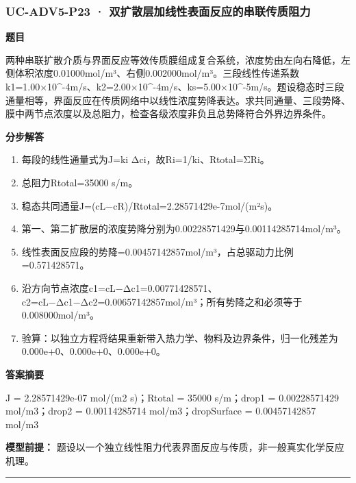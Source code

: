 \documentclass[UTF8,11pt,a4paper]{ctexart}
\begin{document}
\subsubsection*{UC-ADV5-P23 · 双扩散层加线性表面反应的串联传质阻力}
\noindent\textbf{题目}\par
两种串联扩散介质与界面反应等效传质膜组成复合系统，浓度势由左向右降低，左侧体积浓度0.01000mol/m³、右侧0.002000mol/m³。三段线性传递系数k1=1.00×10\textasciicircum{}-4m/s、k2=2.00×10\textasciicircum{}-4m/s、ks=5.00×10\textasciicircum{}-5m/s。题设稳态时三段通量相等，界面反应在传质网络中以线性浓度势降表达。求共同通量、三段势降、膜中两节点浓度以及总阻力，检查各级浓度非负且总势降符合外界边界条件。\par
\medskip\noindent\textbf{分步解答}
\begin{enumerate}
\item 每段的线性通量式为J=ki Δci，故Ri=1/ki、Rtotal=ΣRi。
\item 总阻力Rtotal=35000 s/m。
\item 稳态共同通量J=(cL−cR)/Rtotal=2.28571429e-7mol/(m²s)。
\item 第一、第二扩散层的浓度势降分别为0.00228571429与0.00114285714mol/m³。
\item 线性表面反应段的势降=0.00457142857mol/m³，占总驱动力比例=0.571428571。
\item 沿方向节点浓度c1=cL−Δc1=0.00771428571、c2=cL−Δc1−Δc2=0.00657142857mol/m³；所有势降之和必须等于0.008000mol/m³。
\item 验算：以独立方程将结果重新带入热力学、物料及边界条件，归一化残差为 0.000e+0、0.000e+0、0.000e+0。
\end{enumerate}
\noindent\textbf{答案摘要}\par
J = 2.28571429e-07 mol/(m2 s)；Rtotal = 35000 s/m；drop1 = 0.00228571429 mol/m3；drop2 = 0.00114285714 mol/m3；dropSurface = 0.00457142857 mol/m3\par
\noindent\textbf{模型前提：}
题设以一个独立线性阻力代表界面反应与传质，非一般真实化学反应机理。\par
\medskip\hrule\medskip
{}
\end{document}
